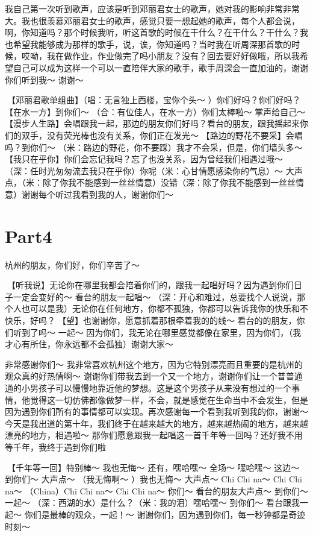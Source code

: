 \documentclass[
]{book}
\begin{document}
我自己第一次听到歌声，应该是听到邓丽君女士的歌声，她对我的影响非常非常大。我也很羡慕邓丽君女士的歌声，感觉只要一想起她的歌声，每个人都会说，啊，你知道吗？那个时候我听，听这首歌的时候在干什么？在干什么？干什么？我也希望我能够成为那样的歌手，说，诶，你知道吗？当时我在听周深那首歌的时候，哎呦，我在做作业，作业做完了吗小朋友？没有？回去要好好做哦，所以我希望自己可以成为这样一个可以一直陪伴大家的歌手，歌手周深会一直加油的，谢谢你们听到我～ 谢谢～

🎵【邓丽君歌单组曲】（唱：无言独上西楼，宝你个头～ ）你们好吗？你们好吗？【在水一方】到你们～ （合：有位佳人，在水一方）你们太棒啦～ 掌声给自己～ 【漫步人生路】会唱跟我一起，那边的朋友你们好吗？看台的朋友，跟我摇起来你们的双手，没有荧光棒也没有关系，你们正在发光～ 【路边的野花不要采】会唱吗？到你们～ （米：路边的野花，你不要踩）我才不会采，但是，你们墙头多～ 【我只在乎你】你们会忘记我吗？忘了也没关系，因为曾经我们相遇过哦～ （深：任时光匆匆流去我只在乎你）你呢（米：心甘情愿感染你的气息）～ 大声点，（米：除了你我不能感到一丝丝情意）没错（深：除了你我不能感到一丝丝情意）谢谢每个听过我看到我的人，谢谢你们～

\section{Part4}\label{hangzhou-20240824-part4}

杭州的朋友，你们好，你们辛苦了～

🎵【听我说】无论你在哪里我都会陪着你们的，跟我一起唱好吗？因为遇到你们日子一定会变好的～ 看台的朋友一起唱～ （深：开心和难过，总要找个人说说，那个人也可以是我）无论你在任何地方，你都不孤独，你都可以告诉我你的快乐和不快乐，好吗？🎵【望】也谢谢你，愿意抓着那根牵着我的的线～ 看台的的朋友，你们听到了吗～ 一起～ 因为你们，我无论在哪里感觉都像在家里，因为你们，（我才心有所住，你永远都不会孤独）谢谢大家～

非常感谢你们～ 我非常喜欢杭州这个地方，因为它特别漂亮而且重要的是杭州的观众真的好热情啊～ 谢谢你们带我去到一个又一个地方，谢谢你们让一个普普通通的小男孩子可以慢慢地靠近他的梦想。这是这个男孩子从来没有想过的一个事情，他觉得这一切仿佛都像做梦一样，不会，就是感觉在生命当中不会发生，但是因为遇到你们所有的事情都可以实现。再次感谢每一个看到我听到我的你，谢谢～ 今天是我出道的第十年，我们终于在越来越大的地方，越来越热闹的地方，越来越漂亮的地方，相遇啦～ 那你们愿意跟我一起唱这一首千年等一回吗？还好我不用等千年，我终于遇到你们啦

🎵【千年等一回】特别棒～ 我也无悔～ 还有，嘿哈嘿～ 全场～ 嘿哈嘿～ 这边～ 到你们～ 大声点～ （我无悔啊～ ）我也无悔～ 大声点～ Chi Chi na～ Chi Chi na～ （China）Chi Chi na～ Chi Chi na～ 你们～ 看台的朋友大声点～ 到你们～ 一起～ （深：西湖的水）是什么？（米：我的泪）嘿哈嘿～ 到你们～ 看台跟我一起～ 你们是最棒的观众，一起！～ 谢谢你们，因为遇到你们，每一秒钟都是奇迹时刻～
\end{document}
